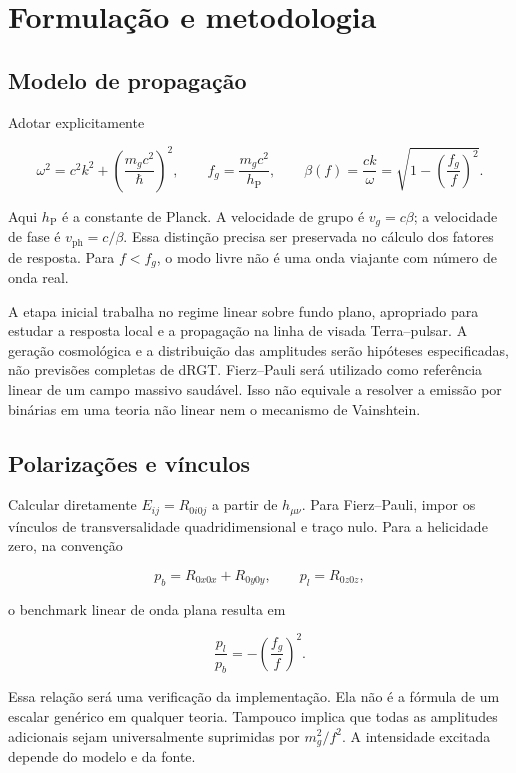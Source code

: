 \chapter{Formulação e metodologia}\label{formulauxe7uxe3o-e-implementauxe7uxe3o}

\section{Modelo de propagação}\label{modelo-de-propagauxe7uxe3o}

Adotar explicitamente

\[\omega^2=c^2k^2+\left(\frac{m_gc^2}{\hbar}\right)^2,\qquad
f_g=\frac{m_gc^2}{h_{\mathrm P}},\qquad
\beta(f)=\frac{ck}{\omega}=\sqrt{1-\left(\frac{f_g}{f}\right)^2}.\]

Aqui \(h_{\mathrm P}\) é a constante de Planck. A velocidade de grupo é
\(v_g=c\beta\); a velocidade de fase é \(v_{\mathrm{ph}}=c/\beta\). Essa
distinção precisa ser preservada no cálculo dos fatores de resposta.
Para \(f<f_g\), o modo livre não é uma onda viajante com número de onda
real.

A etapa inicial trabalha no regime linear sobre fundo plano, apropriado
para estudar a resposta local e a propagação na linha de visada
Terra--pulsar. A geração cosmológica e a distribuição das amplitudes
serão hipóteses especificadas, não previsões completas de dRGT.
Fierz--Pauli será utilizado como referência linear de um campo massivo
saudável. Isso não equivale a resolver a emissão por binárias em uma
teoria não linear nem o mecanismo de Vainshtein.

\section{Polarizações e
vínculos}\label{polarizauxe7uxf5es-e-vuxednculos}

Calcular diretamente \(E_{ij}=R_{0i0j}\) a partir de \(h_{\mu\nu}\).
Para Fierz--Pauli, impor os vínculos de transversalidade
quadridimensional e traço nulo. Para a helicidade zero, na convenção

\[p_b=R_{0x0x}+R_{0y0y},\qquad p_l=R_{0z0z},\]

o benchmark linear de onda plana resulta em

\[\frac{p_l}{p_b}=-\left(\frac{f_g}{f}\right)^2.\]

Essa relação será uma verificação da implementação. Ela não é a fórmula
de um escalar genérico em qualquer teoria. Tampouco implica que todas as
amplitudes adicionais sejam universalmente suprimidas por \(m_g^2/f^2\).
A intensidade excitada depende do modelo e da fonte.

